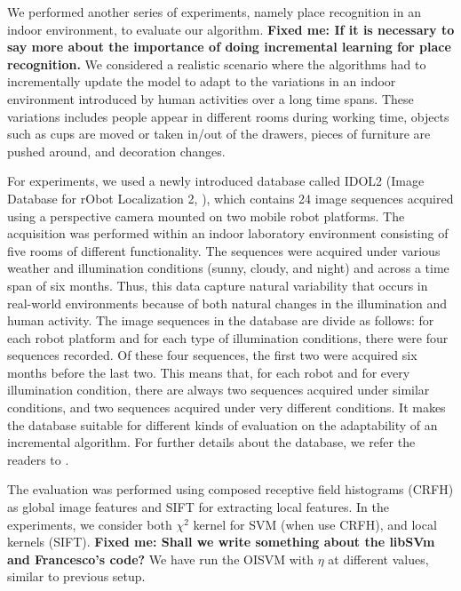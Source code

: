 We performed another series of experiments, namely place recognition in an indoor
environment, to evaluate our algorithm. 
\textbf{Fixed me: If it is necessary to say more about the importance of doing incremental
learning for place recognition.}
We considered a realistic scenario where the algorithms had to incrementally update the
model to adapt to the variations in an indoor environment introduced by human activities
over a long time spans. These variations includes people appear in different rooms during
working time, objects such as cups are moved or taken in/out of the drawers, pieces of
furniture are pushed around, and decoration changes.   

For experiments, we used a newly introduced database called IDOL2 (Image Database
for rObot Localization 2, \cite{luo:idol2}), which contains 24 image sequences acquired
using a perspective camera mounted on two mobile robot platforms. The acquisition was
performed within an indoor laboratory environment consisting of five rooms of different
functionality. The sequences were acquired under various weather and illumination conditions
(sunny, cloudy, and night) and across a time span of six months. Thus, this data capture
natural variability that occurs in real-world environments because of both natural changes
in the illumination and human activity. The image sequences in the database are divide as
follows: for each robot platform and for each type of illumination conditions, there were
four sequences recorded. Of these four sequences, the first two were acquired six months
before the last two. This means that, for each robot and for every illumination condition,
there are always two sequences acquired under similar conditions, and two sequences acquired
under very different conditions. It makes the database suitable for different kinds of
evaluation on the adaptability of an incremental algorithm. For further details about the
database, we refer the readers to \cite{luo:idol2}.

The evaluation was performed using composed receptive field histograms (CRFH)
\cite{Linde:Lindeberg:ICPR04} as global image features and SIFT \cite{lowe99object}
for extracting local features. In the experiments, we consider both $\chi^2$ kernel
for SVM (when use CRFH), and local kernels \cite{wallraven:iccv03} (SIFT).
\textbf{Fixed me: Shall we write something about the libSVm and Francesco's code?} 
We have run the OISVM with $\eta$ at different values, similar to previous setup.

